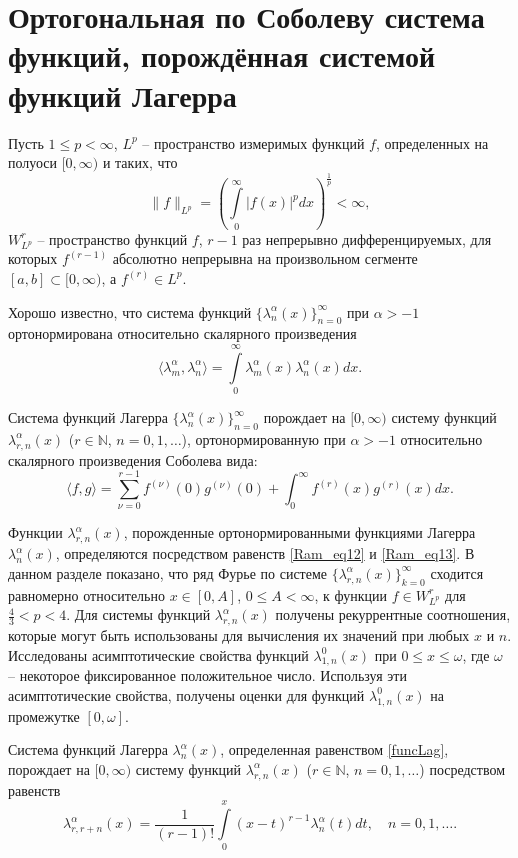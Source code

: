 \section{Ортогональная по Соболеву система функций, порождённая системой функций Лагерра}
Пусть $1\leq p < \infty$, $L^p$ -- пространство измеримых функций $f$, определенных на полуоси $[0, \infty)$ и таких, что
$$
\|f\|_{L^p}=\left(\int\limits_0^{\infty}|f(x)|^pdx\right)^\frac{1}{p}<\infty,
$$
$W^r_{L^p}$ -- пространство функций $f$, $r-1$ раз непрерывно дифференцируемых, для которых $f^{(r-1)}$ абсолютно непрерывна на произвольном сегменте $[a, b]\subset[0, \infty)$, а $f^{(r)}\in L^p$.

Хорошо известно, что система функций $\{\lambda_n^\alpha(x)\}_{n=0}^\infty$ при $\alpha>-1$ ортонормирована относительно скалярного произведения
$$
\langle \lambda_m^\alpha, \lambda_n^\alpha\rangle=\int\limits_0^\infty \lambda_m^\alpha(x)\lambda_n^\alpha(x)dx.
$$

Система функций Лагерра $\{\lambda_n^\alpha(x)\}_{n=0}^\infty$ порождает на $[0, \infty)$ систему функций $\lambda_{r,n}^\alpha(x)$ ($r\in\mathbb{N}$, $n=0, 1, \ldots$), ортонормированную при $\alpha>-1$ относительно скалярного произведения Соболева вида:
\begin{equation}\label{Ram_eq1}
\langle f,g\rangle=\sum_{\nu=0}^{r-1}f^{(\nu)}(0)g^{(\nu)}(0)+\int_{0}^{\infty} f^{(r)}(x)g^{(r)}(x)dx.
\end{equation}

Функции $\lambda_{r,n}^{\alpha}(x)$, порожденные ортонормированными функциями Лагерра $\lambda_{n}^{\alpha}(x)$, определяются посредством равенств \eqref{Ram_eq12} и \eqref{Ram_eq13}.
В данном разделе показано, что ряд Фурье по системе $\{\lambda_{r,n}^{\alpha}(x)\}_{k=0}^\infty$ сходится равномерно относительно $x\in[0, A]$, $0\leq A<\infty$, к функции $f\in W^r_{L^p}$ для $\frac{4}{3}<p<4$.
Для системы функций $\lambda_{r,n}^{\alpha}(x)$ получены рекуррентные соотношения, которые могут быть использованы для вычисления их значений при любых $x$ и $n$.
Исследованы асимптотические свойства функций $\lambda_{1,n}^0(x)$ при $0\leq x\leq\omega$, где $\omega$ -- некоторое фиксированное положительное число. Используя эти асимптотические свойства, получены оценки для функций $\lambda_{1,n}^0(x)$ на промежутке $[0,\omega]$.

Система функций Лагерра $\lambda_n^\alpha(x)$, определенная равенством \eqref{funcLag}, порождает на $[0, \infty)$ систему функций $\lambda_{r,n}^\alpha(x)$ ($r\in\mathbb{N}$, $n=0, 1, \ldots$) посредством равенств
\begin{equation}\label{Ram_eq12}
\lambda_{r,r+n}^{\alpha}(x) =\frac{1}{(r-1)!}\int\limits_{0}^x(x-t)^{r-1}\lambda_{n}^{\alpha}(t)dt, \quad n=0,1,\ldots.
\end{equation}

